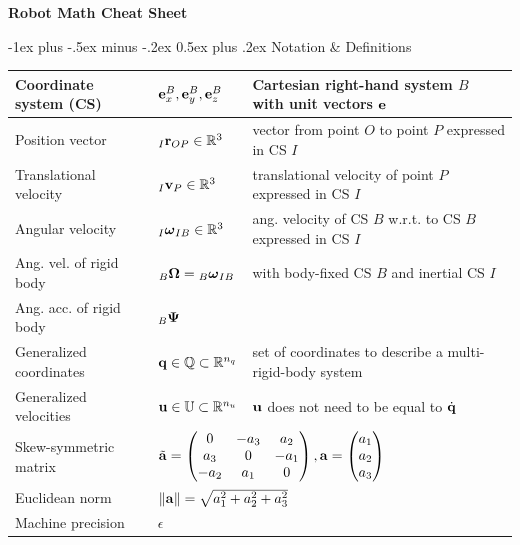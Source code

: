 \documentclass[10pt,landscape,a4paper]{article}
\makeatletter
\renewcommand{\section}{\@startsection{section}{1}{0mm}%
                                {-1ex plus -.5ex minus -.2ex}%
                                {0.5ex plus .2ex}%
                                {\normalfont\large\bfseries}}
\makeatother
\begin{document}
\raggedright
\footnotesize
\begin{multicols}{2}


\setlength{\premulticols}{1pt}
\setlength{\postmulticols}{1pt}
\setlength{\multicolsep}{1pt}
\setlength{\columnsep}{2pt}

\begin{center}
     \Large{\textbf{Robot Math Cheat Sheet}} \\
\end{center}
\section{Notation \& Definitions  }
\begin{tabular}{|l|l|l|}
\hline
Coordinate system (CS) & ${\mathbf e_x^B,\mathbf e_y^B,\mathbf e_z^B}$ & Cartesian right-hand system $B$ with unit vectors $\mathbf e$  \\ \hline
Position vector & ${}_I\mathbf r_{OP} \in \mathbb{R}^3 $ & vector from point $O$ to point $P$ expressed in CS $I$ \\ \hline 
Translational velocity & ${}_I\mathbf v_P \in \mathbb{R}^3 $  & translational velocity of point $P$ expressed in CS $I$ \\ \hline
Angular velocity & ${}_I\mbox{\boldmath $\omega$}_{IB} \in \mathbb{R}^3 $ & ang. velocity of CS $B$ w.r.t. to CS $B$ expressed in CS $I$ \\ \hline
Ang. vel. of rigid body & ${}_B\mathbf \Omega = {}_B\mbox{\boldmath $\omega$}_{IB}$ & with body-fixed CS $B$ and inertial CS $I$ \\ \hline
Ang. acc. of rigid body & ${}_B\mathbf \Psi$ \\ \hline
Generalized coordinates & $\mathbf q \in \mathbb{Q} \subset \mathbb{R}^{n_q}$ & set of coordinates to describe a multi-rigid-body system\\ \hline
Generalized velocities & $\mathbf u \in \mathbb{U} \subset \mathbb{R}^{n_u}$ & $\mathbf u$ does not need to be equal to $\dot{\mathbf q}$\\ \hline
Skew-symmetric matrix & \multicolumn{2}{l|}{$\tilde{\mathbf a} = \begin{pmatrix} 0 & -a_3 & a_2 \\ a_3 & 0 & -a_1 \\ -a_2 & a_1 & 0 \end{pmatrix}, \mathbf a = \begin{pmatrix} a_1 \\ a_2 \\ a_3\end{pmatrix}$}  \\ \hline
Euclidean norm & \multicolumn{2}{l|}{$\lVert \mathbf a \rVert = \sqrt{a_1^2 + a_2^2 + a_3^2}$} \\ \hline
Machine precision & $\epsilon$ & \\ \hline
\end{tabular}


\end{multicols}
\end{document}
